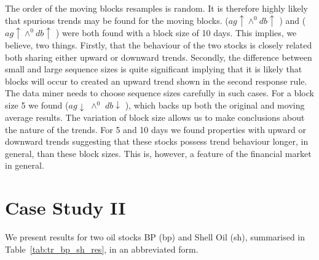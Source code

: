 The order of the moving blocks resamples is random. It is therefore
highly likely that spurious trends may be found for the moving blocks.
 ($ag \uparrow \wedge^{0} db \uparrow$ ) and  
($ag \uparrow \wedge^{0} db \uparrow$ ) were both found with a block size
of 10 days. This implies, we believe, two things. Firstly, that the
behaviour of the two stocks is closely related both sharing either
upward or downward trends. Secondly, the difference between small and
large sequence sizes is quite significant implying that it is likely
that blocks will occur to created an upward trend shown in the second
response rule. The data miner needs to choose sequence sizes carefully
in such cases. For a block size 5 we found  ($ ag \downarrow$
$\wedge^0$ $ db \downarrow$ ), which backs up both the original and moving
average results. The variation of block size allows us to make
conclusions about the nature of the trends. For 5 and 10 days we found
properties with upward or downward trends suggesting that these stocks
possess trend behaviour longer, in general, than these block
sizes. This is, however, a feature of the financial market in general.


\section{Case Study II}

We present results for two oil stocks BP (bp) and Shell Oil (sh),
summarised in Table~\ref{tab:tr_bp_sh_res}, in an abbreviated form.

